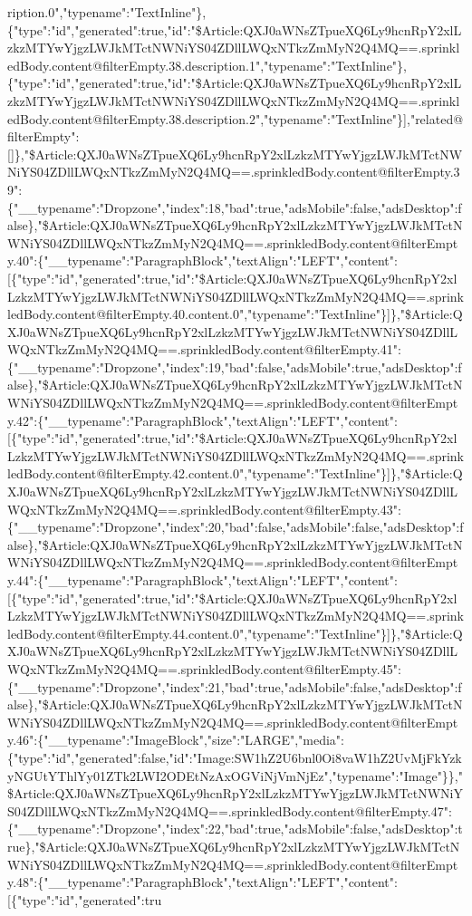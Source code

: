 ription.0","typename":"TextInline"\},\{"type":"id","generated":true,"id":"\$Article:QXJ0aWNsZTpueXQ6Ly9hcnRpY2xlLzkzMTYwYjgzLWJkMTctNWNiYS04ZDllLWQxNTkzZmMyN2Q4MQ==.sprinkledBody.content@filterEmpty.38.description.1","typename":"TextInline"\},\{"type":"id","generated":true,"id":"\$Article:QXJ0aWNsZTpueXQ6Ly9hcnRpY2xlLzkzMTYwYjgzLWJkMTctNWNiYS04ZDllLWQxNTkzZmMyN2Q4MQ==.sprinkledBody.content@filterEmpty.38.description.2","typename":"TextInline"\}{]},"related@filterEmpty":{[}{]}\},"\$Article:QXJ0aWNsZTpueXQ6Ly9hcnRpY2xlLzkzMTYwYjgzLWJkMTctNWNiYS04ZDllLWQxNTkzZmMyN2Q4MQ==.sprinkledBody.content@filterEmpty.39":\{"\_\_typename":"Dropzone","index":18,"bad":true,"adsMobile":false,"adsDesktop":false\},"\$Article:QXJ0aWNsZTpueXQ6Ly9hcnRpY2xlLzkzMTYwYjgzLWJkMTctNWNiYS04ZDllLWQxNTkzZmMyN2Q4MQ==.sprinkledBody.content@filterEmpty.40":\{"\_\_typename":"ParagraphBlock","textAlign":"LEFT","content":{[}\{"type":"id","generated":true,"id":"\$Article:QXJ0aWNsZTpueXQ6Ly9hcnRpY2xlLzkzMTYwYjgzLWJkMTctNWNiYS04ZDllLWQxNTkzZmMyN2Q4MQ==.sprinkledBody.content@filterEmpty.40.content.0","typename":"TextInline"\}{]}\},"\$Article:QXJ0aWNsZTpueXQ6Ly9hcnRpY2xlLzkzMTYwYjgzLWJkMTctNWNiYS04ZDllLWQxNTkzZmMyN2Q4MQ==.sprinkledBody.content@filterEmpty.41":\{"\_\_typename":"Dropzone","index":19,"bad":false,"adsMobile":true,"adsDesktop":false\},"\$Article:QXJ0aWNsZTpueXQ6Ly9hcnRpY2xlLzkzMTYwYjgzLWJkMTctNWNiYS04ZDllLWQxNTkzZmMyN2Q4MQ==.sprinkledBody.content@filterEmpty.42":\{"\_\_typename":"ParagraphBlock","textAlign":"LEFT","content":{[}\{"type":"id","generated":true,"id":"\$Article:QXJ0aWNsZTpueXQ6Ly9hcnRpY2xlLzkzMTYwYjgzLWJkMTctNWNiYS04ZDllLWQxNTkzZmMyN2Q4MQ==.sprinkledBody.content@filterEmpty.42.content.0","typename":"TextInline"\}{]}\},"\$Article:QXJ0aWNsZTpueXQ6Ly9hcnRpY2xlLzkzMTYwYjgzLWJkMTctNWNiYS04ZDllLWQxNTkzZmMyN2Q4MQ==.sprinkledBody.content@filterEmpty.43":\{"\_\_typename":"Dropzone","index":20,"bad":false,"adsMobile":false,"adsDesktop":false\},"\$Article:QXJ0aWNsZTpueXQ6Ly9hcnRpY2xlLzkzMTYwYjgzLWJkMTctNWNiYS04ZDllLWQxNTkzZmMyN2Q4MQ==.sprinkledBody.content@filterEmpty.44":\{"\_\_typename":"ParagraphBlock","textAlign":"LEFT","content":{[}\{"type":"id","generated":true,"id":"\$Article:QXJ0aWNsZTpueXQ6Ly9hcnRpY2xlLzkzMTYwYjgzLWJkMTctNWNiYS04ZDllLWQxNTkzZmMyN2Q4MQ==.sprinkledBody.content@filterEmpty.44.content.0","typename":"TextInline"\}{]}\},"\$Article:QXJ0aWNsZTpueXQ6Ly9hcnRpY2xlLzkzMTYwYjgzLWJkMTctNWNiYS04ZDllLWQxNTkzZmMyN2Q4MQ==.sprinkledBody.content@filterEmpty.45":\{"\_\_typename":"Dropzone","index":21,"bad":true,"adsMobile":false,"adsDesktop":false\},"\$Article:QXJ0aWNsZTpueXQ6Ly9hcnRpY2xlLzkzMTYwYjgzLWJkMTctNWNiYS04ZDllLWQxNTkzZmMyN2Q4MQ==.sprinkledBody.content@filterEmpty.46":\{"\_\_typename":"ImageBlock","size":"LARGE","media":\{"type":"id","generated":false,"id":"Image:SW1hZ2U6bnl0Oi8vaW1hZ2UvMjFkYzkyNGUtYThlYy01ZTk2LWI2ODEtNzAxOGViNjVmNjEz","typename":"Image"\}\},"\$Article:QXJ0aWNsZTpueXQ6Ly9hcnRpY2xlLzkzMTYwYjgzLWJkMTctNWNiYS04ZDllLWQxNTkzZmMyN2Q4MQ==.sprinkledBody.content@filterEmpty.47":\{"\_\_typename":"Dropzone","index":22,"bad":true,"adsMobile":false,"adsDesktop":true\},"\$Article:QXJ0aWNsZTpueXQ6Ly9hcnRpY2xlLzkzMTYwYjgzLWJkMTctNWNiYS04ZDllLWQxNTkzZmMyN2Q4MQ==.sprinkledBody.content@filterEmpty.48":\{"\_\_typename":"ParagraphBlock","textAlign":"LEFT","content":{[}\{"type":"id","generated":tru